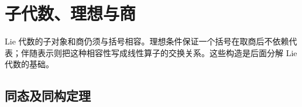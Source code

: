
\section{子代数、理想与商}
\label{b5:sec:1102}


%
%

Lie 代数的子对象和商仍须与括号相容。理想条件保证一个括号在取商后不依赖代表；伴随表示则把这种相容性写成线性算子的交换关系。这些构造是后面分解 Lie 代数的基础。

\subsection{同态及同构定理}
\label{b5:subsec:1102:01}

